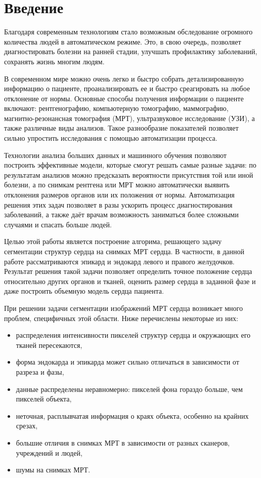 \section{Введение}

Благодаря современным технологиям стало возможным обследование огромного количества людей в автоматическом режиме. Это, в свою очередь, позволяет диагностировать болезни на ранней стадии, улучшать профилактику заболеваний, сохранять жизнь многим людям.

В современном мире можно очень легко и быстро собрать детализированную информацию о пациенте, проанализировать ее и быстро среагировать на любое отклонение от нормы. Основные способы получения информации о пациенте включают: рентгенографию, компьютерную томографию, маммографию, магнитно-резонансная томография (МРТ), ультразвуковое исследование (УЗИ), а также различные виды анализов. Такое разнообразие показателей позволяет сильно упростить исследования с помощью автоматизации процесса.

Технологии анализа больших данных и машинного обучения позволяют построить эффективные модели, которые смогут решать самые разные задачи: по результатам анализов можно предсказать вероятности присутствия той или иной болезни, а по снимкам рентгена или МРТ можно автоматически выявить отклонения размеров органов или их положения от нормы. Автоматизация решения этих задач позволяет в разы ускорить процесс диагностирования заболеваний, а также даёт врачам возможность заниматься более сложными случаями и спасать больше людей.

Целью этой работы является построение алгорима, решающего задачу сегментации структур сердца на снимках МРТ сердца. В частности, в данной работе рассматриваются эпикард и эндокард левого и правого желудочков. Результат решения такой задачи позволяет определить точное положение сердца относительно других органов и тканей, оценить размер сердца в заданной фазе и даже построить объемную модель сердца пациента.

При решении задачи сегментации изображений МРТ сердца возникает много проблем, специфичных этой области. Ниже перечислены некоторые из них:

\begin{itemize}
  \item распределения интенсивности пикселей структур сердца и окружающих его тканей пересекаются,
  \item форма эндокарда и эпикарда может сильно отличаться в зависимости от разреза и фазы,
  \item данные распределены неравномерно: пикселей фона гораздо больше, чем пикселей объекта,
  \item неточная, расплывчатая информация о краях объекта, особенно на крайних срезах,
  \item большие отличия в снимках МРТ в зависимости от разных сканеров, учреждений и людей,
  \item шумы на снимках МРТ.
\end{itemize}

